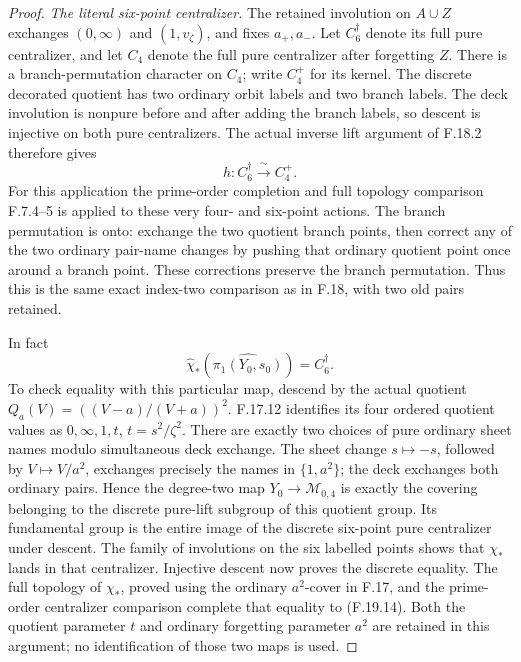 \begin{proof}
\emph{The literal six-point centralizer.}
The retained involution on \(A\cup Z\) exchanges
\((0,\infty)\) and \((1,v_\zeta)\), and fixes \(a_+,a_-\).
Let \(C_6^\dagger\) denote its full pure centralizer,
and let \(C_4\) denote the full pure centralizer after
forgetting \(Z\).
There is a branch-permutation character on \(C_4\);
write \(C_4^+\) for its kernel.
The discrete decorated quotient has two ordinary orbit
labels and two branch labels.
The deck involution is nonpure before and after adding
the branch labels, so descent is injective on both
pure centralizers.
The actual inverse lift argument of F.18.2 therefore gives
\[
              h:C_6^\dagger\xrightarrow{\ \sim\ }C_4^+ .
                                                               \tag{F.19.13}
\]
For this application the prime-order completion and full
topology comparison F.7.4--5 is applied to these very
four- and six-point actions.
The branch permutation is onto: exchange the two
quotient branch points, then correct any of the two
ordinary pair-name changes by pushing that ordinary
quotient point once around a branch point.
These corrections preserve the branch permutation.
Thus this is the same exact index-two comparison as
in F.18, with two old pairs retained.

In fact
\[
             \widehat\chi_*(\widehat{\pi_1(Y_0,s_0)})
                                =C_6^\dagger .                \tag{F.19.14}
\]
To check equality with this particular map, descend by
the actual quotient \(Q_a(V)=((V-a)/(V+a))^2\).
F.17.12 identifies its four ordered quotient values
as \(0,\infty,1,t\), \(t=s^2/\zeta^2\).
There are exactly two choices of pure ordinary sheet
names modulo simultaneous deck exchange.
The sheet change \(s\mapsto-s\), followed by
\(V\mapsto V/a^2\), exchanges precisely the names in
\(\{1,a^2\}\); the deck exchanges both ordinary pairs.
Hence the degree-two map \(Y_0\to\mathcal M_{0,4}\)
is exactly the covering belonging to the discrete
pure-lift subgroup of this quotient group.
Its fundamental group is the entire image of the
discrete six-point pure centralizer under descent.
The family of involutions on the six labelled points
shows that \(\chi_*\) lands in that centralizer.
Injective descent now proves the discrete equality.
The full topology of \(\chi_*\), proved using the
ordinary \(a^2\)-cover in F.17, and the prime-order
centralizer comparison complete that equality to
(F.19.14).
Both the quotient parameter \(t\) and ordinary
forgetting parameter \(a^2\) are retained in this
argument; no identification of those two maps is used.


\end{proof}
